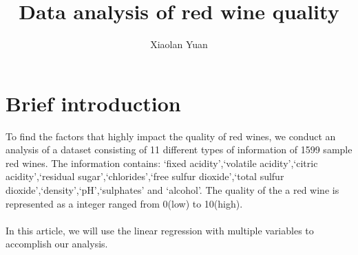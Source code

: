 \documentclass[11pt, oneside]{article}   	%
\title{Data analysis of red wine quality}
\author{Xiaolan Yuan}
\begin{document}
\maketitle
\section{Brief introduction}
To find the factors that highly impact the quality of red wines, we conduct an analysis of a dataset consisting of 11 different types of information of 1599 sample red wines. The information contains: `fixed acidity',`volatile acidity',`citric acidity',`residual sugar',`chlorides',`free sulfur dioxide',`total sulfur dioxide',`density',`pH',`sulphates' and `alcohol'. The quality of the a red wine is represented as a integer ranged from 0(low) to 10(high).\\
\\
In this article, we will use the linear regression with multiple variables to accomplish our analysis.
\end{document}
